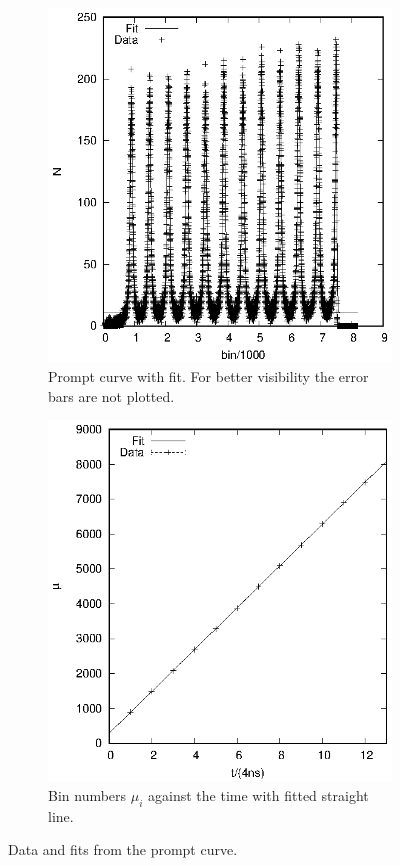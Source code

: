 \begin{figure}[h]
\centering
\begin{subfigure}[h]{0.49\textwidth}
  \centering
  \includegraphics[width=1\linewidth]{evaluation_kilian/prompt/prompt.eps}
  \caption{Prompt curve with fit. For better visibility the error bars are not plotted.}
  \label{fig:prompt}
\end{subfigure}%
\begin{subfigure}[h]{0.49\textwidth}
  \centering
  \includegraphics[width=1\linewidth]{evaluation_kilian/prompt/prompt_means.eps}
  \caption{Bin numbers $\mu_i$ against the time with fitted straight line.}
  \label{fig:prompt_fit}
\end{subfigure}%
\caption{Data and fits from the prompt curve.}
\end{figure}

